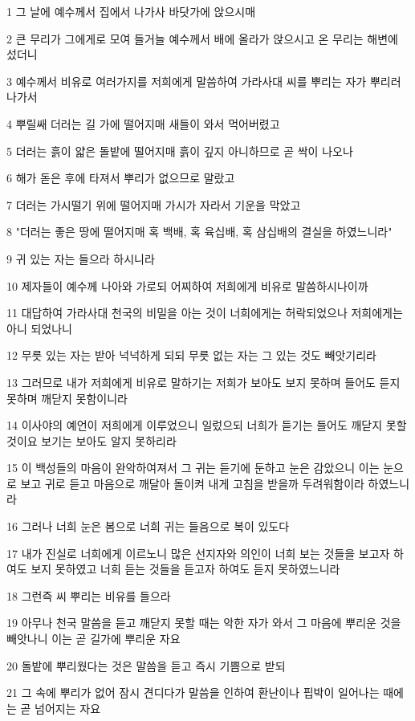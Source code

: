 \par 1 그 날에 예수께서 집에서 나가사 바닷가에 앉으시매
\par 2 큰 무리가 그에게로 모여 들거늘 예수께서 배에 올라가 앉으시고 온 무리는 해변에 섰더니
\par 3 예수께서 비유로 여러가지를 저희에게 말씀하여 가라사대 씨를 뿌리는 자가 뿌리러 나가서
\par 4 뿌릴쌔 더러는 길 가에 떨어지매 새들이 와서 먹어버렸고
\par 5 더러는 흙이 얇은 돌밭에 떨어지매 흙이 깊지 아니하므로 곧 싹이 나오나
\par 6 해가 돋은 후에 타져서 뿌리가 없으므로 말랐고
\par 7 더러는 가시떨기 위에 떨어지매 가시가 자라서 기운을 막았고
\par 8 "더러는 좋은 땅에 떨어지매 혹 백배, 혹 육십배, 혹 삼십배의 결실을 하였느니라"
\par 9 귀 있는 자는 들으라 하시니라
\par 10 제자들이 예수께 나아와 가로되 어찌하여 저희에게 비유로 말씀하시나이까
\par 11 대답하여 가라사대 천국의 비밀을 아는 것이 너희에게는 허락되었으나 저희에게는 아니 되었나니
\par 12 무릇 있는 자는 받아 넉넉하게 되되 무릇 없는 자는 그 있는 것도 빼앗기리라
\par 13 그러므로 내가 저희에게 비유로 말하기는 저희가 보아도 보지 못하며 들어도 듣지 못하며 깨닫지 못함이니라
\par 14 이사야의 예언이 저희에게 이루었으니 일렀으되 너희가 듣기는 들어도 깨닫지 못할 것이요 보기는 보아도 알지 못하리라
\par 15 이 백성들의 마음이 완악하여져서 그 귀는 듣기에 둔하고 눈은 감았으니 이는 눈으로 보고 귀로 듣고 마음으로 깨달아 돌이켜 내게 고침을 받을까 두려워함이라 하였느니라
\par 16 그러나 너희 눈은 봄으로 너희 귀는 들음으로 복이 있도다
\par 17 내가 진실로 너희에게 이르노니 많은 선지자와 의인이 너희 보는 것들을 보고자 하여도 보지 못하였고 너희 듣는 것들을 듣고자 하여도 듣지 못하였느니라
\par 18 그런즉 씨 뿌리는 비유를 들으라
\par 19 아무나 천국 말씀을 듣고 깨닫지 못할 때는 악한 자가 와서 그 마음에 뿌리운 것을 빼앗나니 이는 곧 길가에 뿌리운 자요
\par 20 돌밭에 뿌리웠다는 것은 말씀을 듣고 즉시 기쁨으로 받되
\par 21 그 속에 뿌리가 없어 잠시 견디다가 말씀을 인하여 환난이나 핍박이 일어나는 때에는 곧 넘어지는 자요
